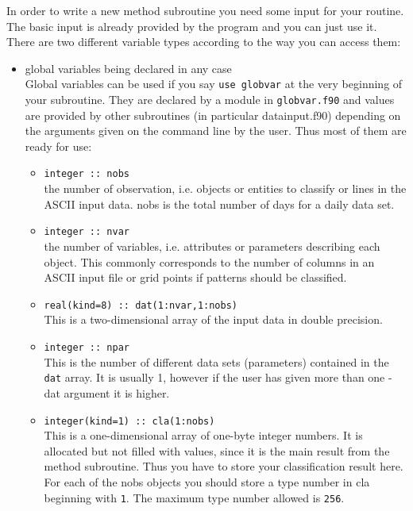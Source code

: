 \documentclass[12pt, oneside, a4paper, headsepline, plainheadsepline]{scrbook}
\begin{document}
In order to write a new method subroutine you need some input for your routine. The basic input
is already provided by the program and you can just use it. There are two different variable types
according to the way you can access them:

\begin{itemize}

\item global variables being declared in any case \\
	Global variables can be used if you say \verb+use globvar+ at the very beginning of your subroutine. They are
	declared by a module in \verb+globvar.f90+ and values are provided by other subroutines (in particular datainput.f90)
	depending on the arguments given on the command line by the user. 
	Thus most of them are ready for use:
	\begin{itemize}
	\item \verb+integer :: nobs+ \\
		the number of observation, i.e. objects or entities to classify or lines in the ASCII input data. 
		nobs is the total number of days for a daily data set.
	\item \verb+integer :: nvar+ \\
		the number of variables, i.e. attributes or parameters describing each object. This commonly corresponds
		to the number of columns in an ASCII input file or grid points if patterns should be classified.
	\item \verb+real(kind=8) :: dat(1:nvar,1:nobs)+ \\
		This is a two-dimensional array of the input data in double precision.
	\item \verb+integer :: npar+ \\
		This is the number of different data sets (parameters) contained in the \verb+dat+ array. It is usually 1, 
		however if the user has given more than one -dat argument it is higher.
	\item \verb+integer(kind=1) :: cla(1:nobs)+ \\
		This is a one-dimensional array of one-byte integer numbers. It is allocated but not filled with values, since
		it is the main result from the method subroutine. Thus you have to store your classification result here.
		For each of the nobs objects you should store a type number in cla beginning with \verb+1+. 
		The maximum type number allowed is \verb+256+.
    \end{itemize}


\end{itemize}
\end{document}
